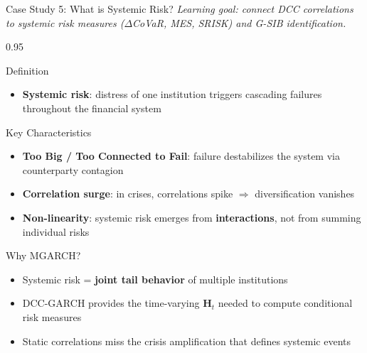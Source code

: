 \documentclass[9pt, aspectratio=169, t]{beamer}
\begin{document}
\begin{frame}{Case Study 5: What is Systemic Risk?}
    \vspace{-2mm}
    {\scriptsize\textit{Learning goal: connect DCC correlations to systemic risk measures ($\Delta$CoVaR, MES, SRISK) and G-SIB identification.}}\vspace{1mm}
    \begin{cminipage}{0.95\textwidth}
    {\scriptsize
    \begin{block}{Definition}
        \begin{itemize}\setlength{\itemsep}{0pt}
            \item \textbf{Systemic risk}: distress of one institution triggers cascading failures throughout the financial system
        \end{itemize}
    \end{block}
    \vspace{-2mm}
    \begin{block}{Key Characteristics}
        \begin{itemize}\setlength{\itemsep}{0pt}
            \item \textbf{Too Big / Too Connected to Fail}: failure destabilizes the system via counterparty contagion
            \item \textbf{Correlation surge}: in crises, correlations spike $\Rightarrow$ diversification vanishes
            \item \textbf{Non-linearity}: systemic risk emerges from \textbf{interactions}, not from summing individual risks
        \end{itemize}
    \end{block}
    \vspace{-2mm}
    \begin{alertblock}{Why MGARCH?}
        \begin{itemize}\setlength{\itemsep}{0pt}
            \item Systemic risk = \textbf{joint tail behavior} of multiple institutions
            \item DCC-GARCH provides the time-varying $\mathbf{H}_t$ needed to compute conditional risk measures
            \item Static correlations miss the crisis amplification that defines systemic events
        \end{itemize}
    \end{alertblock}
    }
    \end{cminipage}
\end{frame}
\end{document}
